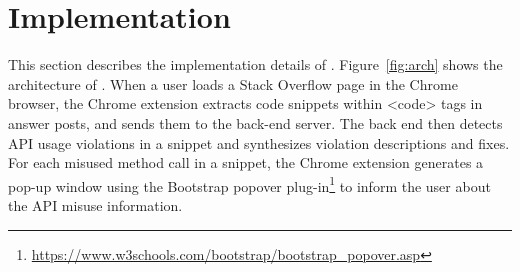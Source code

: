 \section{Implementation}
\label{sec:implementation}

This section describes the implementation details of {\tool}. Figure~\ref{fig:arch} shows the architecture of {\tool}.  When a user loads a Stack Overflow page in the Chrome browser, the Chrome extension extracts code snippets within {\ttt <code>} tags in answer posts, and sends them to the back-end server. The back end then detects API usage violations in a snippet and synthesizes violation descriptions and fixes. For each misused method call in a snippet, the Chrome extension generates a pop-up window using the Bootstrap popover plug-in\footnote{\url{https://www.w3schools.com/bootstrap/bootstrap_popover.asp}} to inform the user about the API misuse information.


